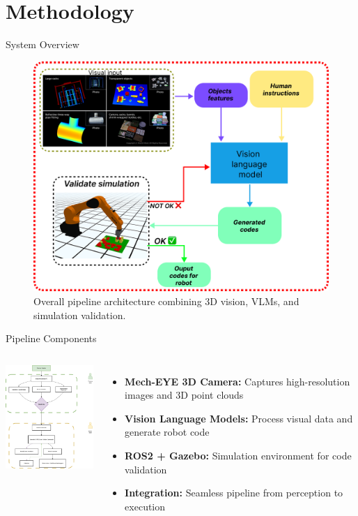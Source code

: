 \documentclass{beamer}
\begin{document}
\section{Methodology} 

\begin{frame}{System Overview}
    \begin{figure}
        \centering
        \includegraphics[width=.8\linewidth]{OJT_fig_1.png}
        \caption{Overall pipeline architecture combining 3D vision, VLMs, and simulation validation.}
    \end{figure}	
\end{frame}

\begin{frame}{Pipeline Components}
    \begin{columns}
        \centering
        \includegraphics[width=5cm]{flow.png}
        \begin{itemize}
            \item \textbf{Mech-EYE 3D Camera:} Captures high-resolution images and 3D point clouds
            \item \textbf{Vision Language Models:} Process visual data and generate robot code
            \item \textbf{ROS2 + Gazebo:} Simulation environment for code validation
            \item \textbf{Integration:} Seamless pipeline from perception to execution
        \end{itemize}
    \end{columns}
\end{frame}
\end{document}
